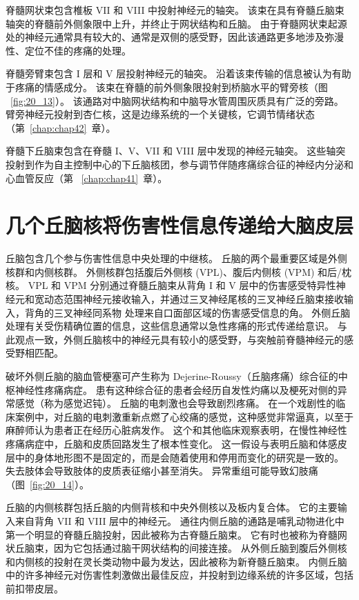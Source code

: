 脊髓网状束包含椎板 VII 和 VIII 中投射神经元的轴突。
该束在具有脊髓丘脑束轴突的脊髓前外侧象限中上升，并终止于网状结构和丘脑。
由于脊髓网状束起源处的神经元通常具有较大的、通常是双侧的感受野，因此该通路更多地涉及弥漫性、定位不佳的疼痛的处理。


脊髓旁臂束包含 I 层和 V 层投射神经元的轴突。
沿着该束传输的信息被认为有助于疼痛的情感成分。 
该束在脊髓的前外侧象限投射到桥脑水平的臂旁核（图 ~\ref{fig:20_13}）。
该通路对中脑网状结构和中脑导水管周围灰质具有广泛的旁路。
臂旁神经元投射到杏仁核，这是边缘系统的一个关键核，它调节情绪状态（第~\ref{chap:chap42}~章）。


脊髓下丘脑束包含在脊髓 I、V、VII 和 VIII 层中发现的神经元轴突。
这些轴突投射到作为自主控制中心的下丘脑核团，参与调节伴随疼痛综合征的神经内分泌和心血管反应（第 ~\ref{chap:chap41}~章）。



\section{几个丘脑核将伤害性信息传递给大脑皮层}

丘脑包含几个参与伤害性信息中央处理的中继核。
丘脑的两个最重要区域是外侧核群和内侧核群。
外侧核群包括腹后外侧核 (VPL)、腹后内侧核 (VPM) 和后/枕核。
VPL 和 VPM 分别通过脊髓丘脑束从背角 I 和 V 层中的伤害感受特异性神经元和宽动态范围神经元接收输入，并通过三叉神经尾核的三叉神经丘脑束接收输入，背角的三叉神经同系物 处理来自口面部区域的伤害感受信息的角。
外侧丘脑处理有关受伤精确位置的信息，这些信息通常以急性疼痛的形式传递给意识。
与此观点一致，外侧丘脑核中的神经元具有较小的感受野，与突触前脊髓神经元的感受野相匹配。


破坏外侧丘脑的脑血管梗塞可产生称为 Dejerine-Roussy（丘脑疼痛）综合征的中枢神经性疼痛病症。
患有这种综合征的患者会经历自发性灼痛以及梗死对侧的异常感觉（称为感觉迟钝）。
丘脑的电刺激也会导致剧烈疼痛。
在一个戏剧性的临床案例中，对丘脑的电刺激重新点燃了心绞痛的感觉，这种感觉非常逼真，以至于麻醉师认为患者正在经历心脏病发作。
这个和其他临床观察表明，在慢性神经性疼痛病症中，丘脑和皮质回路发生了根本性变化。
这一假设与表明丘脑和体感皮层中的身体地形图不是固定的，而是会随着使用和停用而变化的研究是一致的。
失去肢体会导致肢体的皮质表征缩小甚至消失。
异常重组可能导致幻肢痛（图~\ref{fig:20_14}）。


丘脑的内侧核群包括丘脑的内侧背核和中央外侧核以及板内复合体。
它的主要输入来自背角 VII 和 VIII 层中的神经元。 
通往内侧丘脑的通路是哺乳动物进化中第一个明显的脊髓丘脑投射，因此被称为古脊髓丘脑束。
它有时也被称为脊髓网状丘脑束，因为它包括通过脑干网状结构的间接连接。
从外侧丘脑到腹后外侧核和内侧核的投射在灵长类动物中最为发达，因此被称为新脊髓丘脑束。
内侧丘脑中的许多神经元对伤害性刺激做出最佳反应，并投射到边缘系统的许多区域，包括前扣带皮层。



